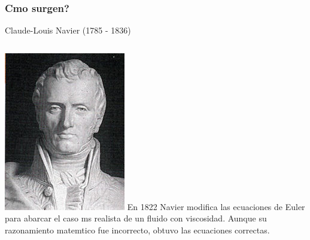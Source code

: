 \documentclass[serif,9pt]{beamer}
\begin{document}
\begin{frame}\frametitle{ Cmo surgen?} 

\begin{block}{Claude-Louis Navier (1785 - 1836)}
\begin{columns}
 \hspace{0.9cm}
\includegraphics[width=\textwidth]{Navier} 
En 1822 Navier modifica las ecuaciones de Euler para abarcar el caso ms realista de un fluido con viscosidad.
Aunque su razonamiento matemtico fue incorrecto, obtuvo las ecuaciones correctas.
\end{columns}
\end{block}

\pause
\bigskip


\end{frame}
\end{document}
